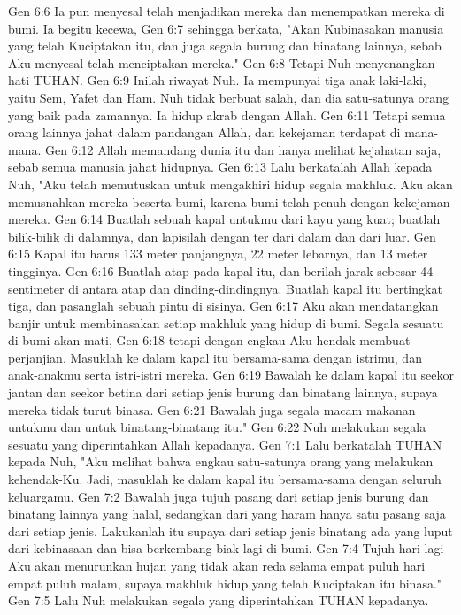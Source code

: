 Gen 6:6  Ia pun menyesal telah menjadikan mereka dan menempatkan mereka di bumi. Ia begitu kecewa,
Gen 6:7  sehingga berkata, "Akan Kubinasakan manusia yang telah Kuciptakan itu, dan juga segala burung dan binatang lainnya, sebab Aku menyesal telah menciptakan mereka."
Gen 6:8  Tetapi Nuh menyenangkan hati TUHAN.
Gen 6:9  Inilah riwayat Nuh. Ia mempunyai tiga anak laki-laki, yaitu Sem, Yafet dan Ham. Nuh tidak berbuat salah, dan dia satu-satunya orang yang baik pada zamannya. Ia hidup akrab dengan Allah.
Gen 6:11  Tetapi semua orang lainnya jahat dalam pandangan Allah, dan kekejaman terdapat di mana-mana.
Gen 6:12  Allah memandang dunia itu dan hanya melihat kejahatan saja, sebab semua manusia jahat hidupnya.
Gen 6:13  Lalu berkatalah Allah kepada Nuh, "Aku telah memutuskan untuk mengakhiri hidup segala makhluk. Aku akan memusnahkan mereka beserta bumi, karena bumi telah penuh dengan kekejaman mereka.
Gen 6:14  Buatlah sebuah kapal untukmu dari kayu yang kuat; buatlah bilik-bilik di dalamnya, dan lapisilah dengan ter dari dalam dan dari luar.
Gen 6:15  Kapal itu harus 133 meter panjangnya, 22 meter lebarnya, dan 13 meter tingginya.
Gen 6:16  Buatlah atap pada kapal itu, dan berilah jarak sebesar 44 sentimeter di antara atap dan dinding-dindingnya. Buatlah kapal itu bertingkat tiga, dan pasanglah sebuah pintu di sisinya.
Gen 6:17  Aku akan mendatangkan banjir untuk membinasakan setiap makhluk yang hidup di bumi. Segala sesuatu di bumi akan mati,
Gen 6:18  tetapi dengan engkau Aku hendak membuat perjanjian. Masuklah ke dalam kapal itu bersama-sama dengan istrimu, dan anak-anakmu serta istri-istri mereka.
Gen 6:19  Bawalah ke dalam kapal itu seekor jantan dan seekor betina dari setiap jenis burung dan binatang lainnya, supaya mereka tidak turut binasa.
Gen 6:21  Bawalah juga segala macam makanan untukmu dan untuk binatang-binatang itu."
Gen 6:22  Nuh melakukan segala sesuatu yang diperintahkan Allah kepadanya.
Gen 7:1  Lalu berkatalah TUHAN kepada Nuh, "Aku melihat bahwa engkau satu-satunya orang yang melakukan kehendak-Ku. Jadi, masuklah ke dalam kapal itu bersama-sama dengan seluruh keluargamu.
Gen 7:2  Bawalah juga tujuh pasang dari setiap jenis burung dan binatang lainnya yang halal, sedangkan dari yang haram hanya satu pasang saja dari setiap jenis. Lakukanlah itu supaya dari setiap jenis binatang ada yang luput dari kebinasaan dan bisa berkembang biak lagi di bumi.
Gen 7:4  Tujuh hari lagi Aku akan menurunkan hujan yang tidak akan reda selama empat puluh hari empat puluh malam, supaya makhluk hidup yang telah Kuciptakan itu binasa."
Gen 7:5  Lalu Nuh melakukan segala yang diperintahkan TUHAN kepadanya.
